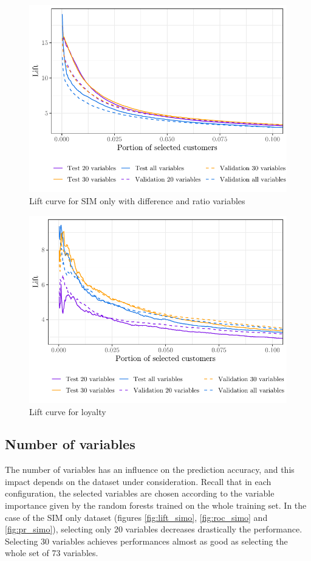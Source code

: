 \begin{figure}
    \centering
    \includegraphics[width=0.9\linewidth]{figures/lift_simo_diff.pdf}
    \caption{Lift curve for SIM only with difference and ratio variables}
    \label{fig:lift_simo_diff}
\end{figure}

\begin{figure}
    \centering
    \includegraphics[width=0.9\linewidth]{figures/lift_loy.pdf}
    \caption{Lift curve for loyalty}
    \label{fig:lift_loy}
\end{figure}

\subsection{Number of variables}

The number of variables has an influence on the prediction accuracy, and this
impact depends on the dataset under consideration. Recall that in each
configuration, the selected variables are chosen according to the variable
importance given by the random forests trained on the whole training set. In the
case of the SIM only dataset (figures \ref{fig:lift_simo}, \ref{fig:roc_simo}
and \ref{fig:pr_simo}), selecting only 20 variables decreases drastically the
performance. Selecting 30 variables achieves performances almost as good as
selecting the whole set of 73 variables.

